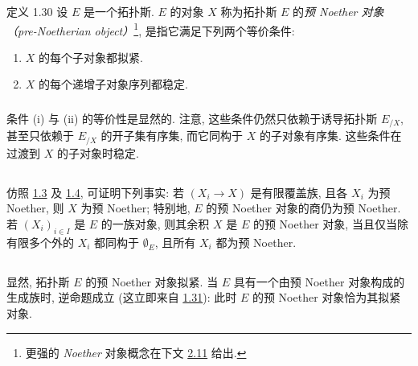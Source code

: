 \begin{enonce*}{定义 1.30}
设 $E$ 是一个拓扑斯.
$E$ 的对象 $X$ 称为拓扑斯 $E$ 的\emph{预 Noether 对象（pre-Noetherian object）}\footnote{更强的 \emph{Noether} 对象概念在下文
\hyperref[VI.def2.11]{2.11} 给出.},
是指它满足下列两个等价条件:
\begin{enumerate}
\renewcommand{\theenumi}{\roman{enumi}}
\renewcommand{\labelenumi}{(\theenumi)}

\item $X$ 的每个子对象都拟紧.

\item $X$ 的每个递增子对象序列都稳定.
\end{enumerate}
\end{enonce*}

\setcounter{subsection}{30}
\setcounter{subsubsection}{0}
\subsubsection{}
条件 (i) 与 (ii) 的等价性是显然的.
注意, 这些条件仍然只依赖于诱导拓扑斯 $E_{/X}$,
甚至只依赖于 $E_{/X}$ 的开子集有序集,
而它同构于 $X$ 的子对象有序集.
这些条件在过渡到 $X$ 的子对象时稳定.





\subsection{}
仿照\pageoriginale{} \hyperref[VI.prop1.3]{1.3}
及 \hyperref[VI.cor1.4]{1.4}, 可证明下列事实:
若 $(X_i\to X)$ 是有限覆盖族, 且各 $X_i$ 为预 Noether,
则 $X$ 为预 Noether;
特别地, $E$ 的预 Noether 对象的商仍为预 Noether.
若 $(X_i)_{i\in I}$ 是 $E$ 的一族对象,
则其余积 $X$ 是 $E$ 的预 Noether 对象,
当且仅当除有限多个外的 $X_i$ 都同构于 $∅_E$,
且所有 $X_i$ 都为预 Noether.

\subsection{}
显然, 拓扑斯 $E$ 的预 Noether 对象拟紧.
当 $E$ 具有一个由预 Noether 对象构成的生成族时,
逆命题成立 (这立即来自 \hyperref[VI.subsec1.31]{1.31}):
此时 $E$ 的预 Noether 对象恰为其拟紧对象.

